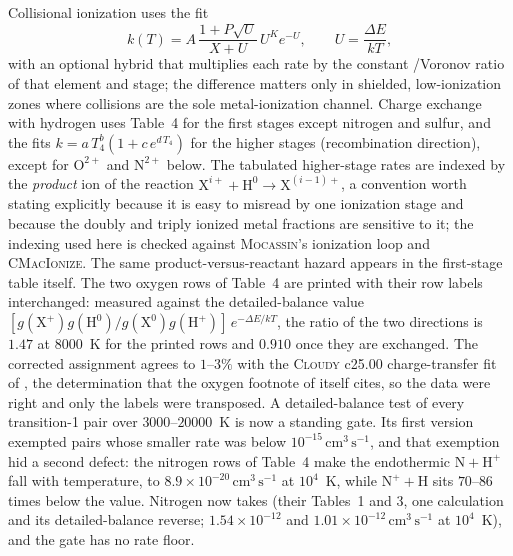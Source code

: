 \documentclass[twocolumn,linenumbers]{aastex702}
\newcommand{\cmc}{\mathrm{cm^{3}\,s^{-1}}}
\begin{document}
Collisional ionization uses the \citet{voronov1997} fit
\begin{equation}
  k(T) = A\,\frac{1 + P\sqrt{U}}{X + U}\,U^{K} e^{-U},
  \qquad U = \frac{\Delta E}{kT},
\end{equation}%
with an optional hybrid that multiplies each rate by the constant
\citet{dere2007}/Voronov ratio of that element and stage; the difference matters
only in shielded, low-ionization zones where collisions are the sole
metal-ionization channel.  Charge exchange with hydrogen uses
\citet{huang2023} Table~4 for the first stages except nitrogen and sulfur,
and the
\citet{kingdon1996} fits $k = a\,T_4^{b}(1 + c\,e^{d\,T_4})$ for the higher
stages (recombination direction), except for $\mathrm{O}^{2+}$ and
$\mathrm{N}^{2+}$ below.  The tabulated higher-stage rates are
indexed by the \emph{product} ion of the reaction
$\mathrm{X}^{i+} + \mathrm{H}^{0} \to \mathrm{X}^{(i-1)+}$, a convention worth
stating explicitly because it is easy to misread by one ionization stage and
because the doubly and triply ionized metal fractions are sensitive to it;
the indexing used here is checked against \textsc{Mocassin}'s ionization loop
and \textsc{CMacIonize}.  The same product-versus-reactant hazard appears in
the first-stage table itself.  The two oxygen rows of \citet{huang2023}
Table~4 are printed with their row labels interchanged: measured against the
detailed-balance value
$[g(\mathrm{X}^{+})g(\mathrm{H}^{0})/g(\mathrm{X}^{0})g(\mathrm{H}^{+})]\,
e^{-\Delta E/kT}$, the ratio of the two directions is $1.47$ at $8000$~K for
the printed rows and $0.910$ once they are exchanged.  The corrected
assignment agrees to $1$--$3\%$ with the \textsc{Cloudy} c25.00
charge-transfer fit of \citet{stancil1999}, the determination that the oxygen
footnote of \citet{huang2023} itself cites, so the data were right and only
the labels were transposed.  A detailed-balance test of every transition-1
pair over $3000$--$20000$~K is now a standing gate.  Its first version
exempted pairs whose smaller rate was below $10^{-15}\,\cmc$, and that
exemption hid a second defect: the nitrogen rows of \citet{huang2023}
Table~4 make the endothermic $\mathrm{N} + \mathrm{H}^{+}$ fall with
temperature, to $8.9\times10^{-20}\,\cmc$ at $10^4$~K, while
$\mathrm{N}^{+} + \mathrm{H}$ sits $70$--$86$ times below the
\citet{kingdon1996} value.  Nitrogen now takes \citet{kingdon1996}
(their Tables~1 and 3, one calculation and its detailed-balance reverse;
$1.54\times10^{-12}$ and $1.01\times10^{-12}\,\cmc$ at $10^4$~K), and the
gate has no rate floor.
\end{document}

